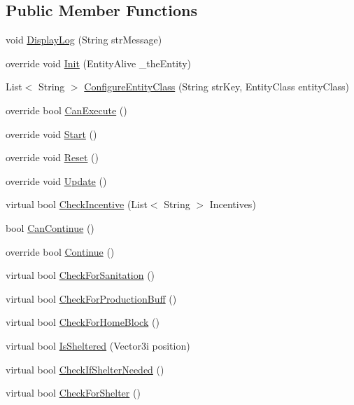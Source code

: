\subsection*{Public Member Functions}
\begin{DoxyCompactItemize}
\item 
void \mbox{\hyperlink{class_new___e_a_i_maslow_level1_s_d_x_a5675ba805574359a549eec08d6d6a7c9}{Display\+Log}} (String str\+Message)
\item 
override void \mbox{\hyperlink{class_new___e_a_i_maslow_level1_s_d_x_a3f62acd1ae136e5f827b8348b0ebd88e}{Init}} (Entity\+Alive \+\_\+the\+Entity)
\item 
List$<$ String $>$ \mbox{\hyperlink{class_new___e_a_i_maslow_level1_s_d_x_adceb186377b70158ef03b8ac1759efcd}{Configure\+Entity\+Class}} (String str\+Key, Entity\+Class entity\+Class)
\item 
override bool \mbox{\hyperlink{class_new___e_a_i_maslow_level1_s_d_x_ad3d6580ec493e461862c2bda9a363bda}{Can\+Execute}} ()
\item 
override void \mbox{\hyperlink{class_new___e_a_i_maslow_level1_s_d_x_a6a329f69e8b16b28d143261f34bb4290}{Start}} ()
\item 
override void \mbox{\hyperlink{class_new___e_a_i_maslow_level1_s_d_x_a0a2a1853f09db9e46ed338f37634c963}{Reset}} ()
\item 
override void \mbox{\hyperlink{class_new___e_a_i_maslow_level1_s_d_x_a80adef21b5b5291cd4c2c7d15ec5bdc5}{Update}} ()
\item 
virtual bool \mbox{\hyperlink{class_new___e_a_i_maslow_level1_s_d_x_a41048af250e982f462e0fd2dcfbfa258}{Check\+Incentive}} (List$<$ String $>$ Incentives)
\item 
bool \mbox{\hyperlink{class_new___e_a_i_maslow_level1_s_d_x_a8146c0524043632403c458d4a00b4ac3}{Can\+Continue}} ()
\item 
override bool \mbox{\hyperlink{class_new___e_a_i_maslow_level1_s_d_x_a6f51f6b0995bed3d2b49229b9457a421}{Continue}} ()
\item 
virtual bool \mbox{\hyperlink{class_new___e_a_i_maslow_level1_s_d_x_a37467fa2d2c3fccd1c7c43d8d99a6f9d}{Check\+For\+Sanitation}} ()
\item 
virtual bool \mbox{\hyperlink{class_new___e_a_i_maslow_level1_s_d_x_a97715b5d5bed1a307be24ea923586bc9}{Check\+For\+Production\+Buff}} ()
\item 
virtual bool \mbox{\hyperlink{class_new___e_a_i_maslow_level1_s_d_x_a1cf880dbdab6b03674da77e9191970b7}{Check\+For\+Home\+Block}} ()
\item 
virtual bool \mbox{\hyperlink{class_new___e_a_i_maslow_level1_s_d_x_af5aa7fc6aab1b4a97cb4538893657c7b}{Is\+Sheltered}} (Vector3i position)
\item 
virtual bool \mbox{\hyperlink{class_new___e_a_i_maslow_level1_s_d_x_a2b1a6463d17b5a38a9926ed643fe386b}{Check\+If\+Shelter\+Needed}} ()
\item 
virtual bool \mbox{\hyperlink{class_new___e_a_i_maslow_level1_s_d_x_ab0e37971339c778c4b771865faba3b20}{Check\+For\+Shelter}} ()
\end{DoxyCompactItemize}
